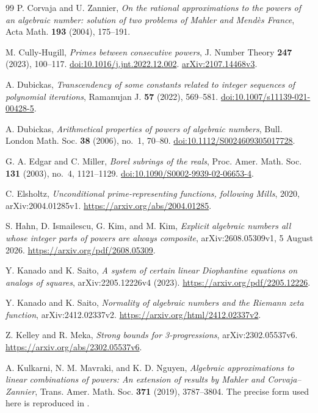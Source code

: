 \documentclass[11pt,a4paper]{article}
\theoremstyle{definition}
\theoremstyle{remark}
\numberwithin{equation}{section}
\begin{document}
\begin{thebibliography}{99}
P. Corvaja and U. Zannier,
\emph{On the rational approximations to the powers of an algebraic
number: solution of two problems of Mahler and Mend\`es France},
Acta Math. \textbf{193} (2004), 175--191.

M. Cully-Hugill,
\emph{Primes between consecutive powers},
J. Number Theory \textbf{247} (2023), 100--117.
\href{https://doi.org/10.1016/j.jnt.2022.12.002}{doi:10.1016/j.jnt.2022.12.002}.
\href{https://arxiv.org/abs/2107.14468v3}{arXiv:2107.14468v3}.

A. Dubickas, \emph{Transcendency of some constants related to integer
sequences of polynomial iterations}, Ramanujan J. \textbf{57} (2022),
569--581.
\href{https://doi.org/10.1007/s11139-021-00428-5}{doi:10.1007/s11139-021-00428-5}.

A. Dubickas, \emph{Arithmetical properties of powers of algebraic numbers},
Bull. London Math. Soc. \textbf{38} (2006), no.~1, 70--80.
\href{https://doi.org/10.1112/S0024609305017728}{doi:10.1112/S0024609305017728}.

G. A. Edgar and C. Miller,
\emph{Borel subrings of the reals},
Proc. Amer. Math. Soc. \textbf{131} (2003), no.~4, 1121--1129.
\href{https://doi.org/10.1090/S0002-9939-02-06653-4}{doi:10.1090/S0002-9939-02-06653-4}.

C. Elsholtz, \emph{Unconditional prime-representing functions, following Mills},
2020, arXiv:2004.01285v1.
\url{https://arxiv.org/abs/2004.01285}.

S. Hahn, D. Ismailescu, G. Kim, and M. Kim,
\emph{Explicit algebraic numbers all whose integer parts of powers are
always composite}, arXiv:2608.05309v1, 5 August 2026.
\url{https://arxiv.org/pdf/2608.05309}.

Y. Kanado and K. Saito, \emph{A system of certain linear Diophantine
equations on analogs of squares}, arXiv:2205.12226v4 (2023).
\url{https://arxiv.org/pdf/2205.12226}.

Y. Kanado and K. Saito, \emph{Normality of algebraic numbers and the Riemann zeta function},
arXiv:2412.02337v2.
\url{https://arxiv.org/html/2412.02337v2}.

Z. Kelley and R. Meka, \emph{Strong bounds for 3-progressions},
arXiv:2302.05537v6.
\url{https://arxiv.org/abs/2302.05537v6}.

A. Kulkarni, N. M. Mavraki, and K. D. Nguyen,
\emph{Algebraic approximations to linear combinations of powers:
An extension of results by Mahler and Corvaja--Zannier},
Trans. Amer. Math. Soc. \textbf{371} (2019), 3787--3804.
The precise form used here is reproduced in \cite[Theorem~1.2]{Kumar2023}.


\end{thebibliography}
\end{document}
